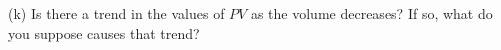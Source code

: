 (k) Is there a trend in the values of $PV$ as the volume decreases? If so, 
what do you suppose causes that trend?







